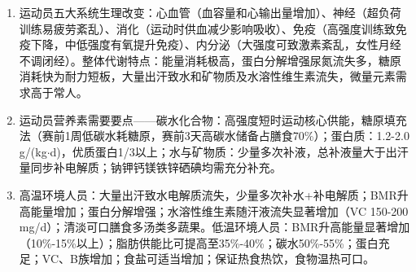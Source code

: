 {\begin{enumerate}[leftmargin=*, itemsep=5pt]
    \item 运动员五大系统生理改变：心血管（血容量和心输出量增加）、神经（超负荷训练易疲劳紊乱）、消化（运动时供血减少影响吸收）、免疫（高强度训练致免疫下降，中低强度有氧提升免疫）、内分泌（大强度可致激素紊乱，女性月经不调闭经）。整体代谢特点：能量消耗极高，蛋白分解增强尿氮流失多，糖原消耗快为耐力短板，大量出汗致水和矿物质及水溶性维生素流失，微量元素需求高于常人。
    \item 运动员营养素需要要点——碳水化合物：高强度短时运动核心供能，糖原填充法（赛前1周低碳水耗糖原，赛前3天高碳水储备占膳食70\%）；蛋白质：1.2-2.0 g/(kg$\cdot$d)，优质蛋白1/3以上；水与矿物质：少量多次补液，总补液量大于出汗量同步补电解质；钠钾钙镁铁锌硒碘均需充分补充。
    \item 高温环境人员：大量出汗致水电解质流失，少量多次补水+补电解质；BMR升高能量增加；蛋白分解增强；水溶性维生素随汗液流失显著增加（VC 150-200 mg/d）；清淡可口膳食多汤类多蔬果。低温环境人员：BMR升高能量显著增加（10\%-15\%以上）；脂肪供能比可提高至35\%-40\%；碳水50\%-55\%；蛋白充足；VC、B族增加；食盐可适当增加；保证热食热饮，食物温热可口。
\end{enumerate}

\newpage
}
